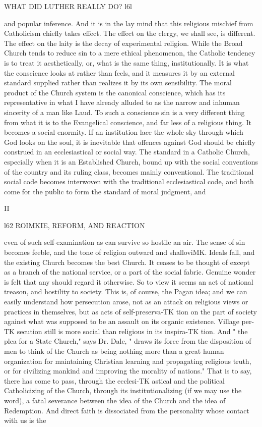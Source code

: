 \documentclass[12pt,a5paper,oneside]{book}
\begin{document}
{WHAT DID LUTHER REALLY DO? l6l 

and popular inference. And it is in the lay mind 
that this religious mischief from Catholicism chiefly 
takes effect. The effect on the clergy, we shall see, 
is different. The effect on the laity is the decay of 
experimental religion. While the Broad Church 
tends to reduce sin to a mere ethical phenomenon, 
the Catholic tendency is to treat it aesthetically, or, 
what is the same thing, institutionally. It is what the 
conscience looks at rather than feels, and it measures it 
by an external standard supplied rather than realizes 
it by its own sensibility. The moral product of the 
Church system is the canonical conscience, which has 
its representative in what I have already alluded to as 
the narrow and inhuman sincerity of a man like Laud. 
To such a conscience sin is a very different thing from 
what it is to the Evangelical conscience, and far less of 
a religious thing. It becomes a social enormity. If 
an institution lace the whole sky through which God 
looks on the soul, it is inevitable that offences against 
God should be chiefly construed in an ecclesiastical or 
social way. The standard in a Catholic Church, 
especially when it is an Established Church, bound 
up with the social conventions of the country and 
its ruling class, becomes mainly conventional. The 
traditional social code becomes interwoven with the 
traditional ecclesiastical code, and both come for the 
public to form the standard of moral judgment, and 

II 



l62 ROIMKIE, REFORM, AND REACTION 

even of such self-examination as can survive so hostile 
an air. The sense of sin becomes feeble, and the 
tone of religion outward and shalloviMK. Ideals fall, 
and the existing Church becomes the best Church. 
It ceases to be thought of except as a branch of 
the national service, or a part of the social fabric. 
Genuine wonder is felt that any should regard it 
otherwise. So to view it seems an act of national 
treason, and hostility to society. This is, of course, 
the Pagan idea; and we can easily understand how 
persecution arose, not as an attack on religious views 
or practices in themselves, but as acts of self-preserva-TK
tion on the part of society against what was supposed 
to be an assault on its organic existence. Village per-TK
secution still is more social than religious in its inspira-TK
tion. And " the plea for a State Church," says Dr. 
Dale, " draws its force from the disposition of men to 
think of the Church as being nothing more than a 
great human organization for maintaining Christian 
learning and propagating religious truth, or for civilizing 
mankind and improving the morality of nations." That 
is to say, there has come to pass, through the ecclesi-TK
astical and the political Catholicizing of the Church, 
through its institutionalizing (if we may use the word), 
a fatal severance between the idea of the Church and 
the idea of Redemption. And direct faith is dissociated 
from the personality whose contact with us is the 



}
\end{document}
